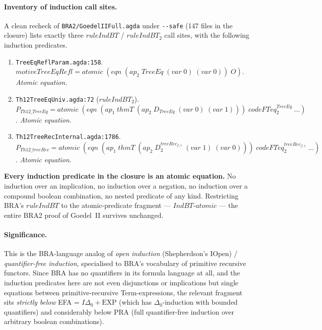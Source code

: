 \documentclass[11pt]{article}
\begin{document}
\paragraph{Inventory of induction call sites.}
A clean recheck of \verb|BRA2/GoedelIIFull.agda| under
\verb|--safe| (147 files in the closure) lists exactly three
$\mathit{ruleIndBT}$ / $\mathit{ruleIndBT}_2$ call sites, with the
following induction predicates.
\begin{enumerate}
  \item \verb|TreeEqReflParam.agda:158|.
        $\mathit{motiveTreeEqRefl}
        = \mathit{atomic}\;(\mathit{eqn}\;(\mathit{ap}_2\;\mathit{TreeEq}\;(\mathit{var}\;0)\;(\mathit{var}\;0))\;O)$.
        \emph{Atomic equation.}
  \item \verb|Th12TreeEqUniv.agda:72| ($\mathit{ruleIndBT}_2$).
        $P_{\mathit{Th12\_TreeEq}}
        = \mathit{atomic}\;(\mathit{eqn}\;
              (\mathit{ap}_1\;\mathit{thmT}\;(\mathit{ap}_2\;D_{\mathit{TreeEq}}\;
                  (\mathit{var}\;0)\;(\mathit{var}\;1)))\;
              \mathit{codeFTeq}_2^{\mathit{TreeEq}}\;\ldots)$.
        \emph{Atomic equation.}
  \item \verb|Th12TreeRecInternal.agda:1786|.
        $P_{\mathit{Th12\_treeRec}}
        = \mathit{atomic}\;(\mathit{eqn}\;
              (\mathit{ap}_1\;\mathit{thmT}\;(\mathit{ap}_2\;D_2^{\mathit{treeRec}_{f,s}}\;
                  (\mathit{var}\;1)\;(\mathit{var}\;0)))\;
              \mathit{codeFTeq}_2^{\mathit{treeRec}_{f,s}}\;\ldots)$.
        \emph{Atomic equation.}
\end{enumerate}

\textbf{Every induction predicate in the closure is an atomic
equation.}  No induction over an implication, no induction over a
negation, no induction over a compound boolean combination, no
nested predicate of any kind.  Restricting BRA's
$\mathit{ruleIndBT}$ to the atomic-predicate fragment ---
$\mathit{IndBT\text{-}atomic}$ --- the entire BRA2 proof of
Goedel~II survives unchanged.

\paragraph{Significance.}
This is the BRA-language analog of \emph{open induction}
(Shepherdson's $\mathrm{IOpen}$) / \emph{quantifier-free induction},
specialised to BRA's vocabulary of primitive recursive functors.
Since BRA has no quantifiers in its formula language at all, and the
induction predicates here are not even disjunctions or implications
but single equations between primitive-recursive Term-expressions,
the relevant fragment sits \emph{strictly below} EFA = $I\Delta_0 +
\mathrm{EXP}$ (which has $\Delta_0$-induction with bounded
quantifiers) and considerably below PRA (full quantifier-free
induction over arbitrary boolean combinations).
\end{document}
